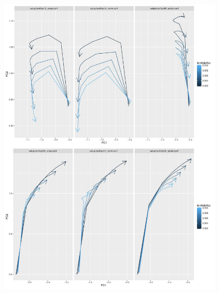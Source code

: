 


\begin{figure}
	\includegraphics[width=\linewidth,height=0.9\textheight]{Figures/Final/A-lutecia-morphotrajs.jpg}

\end{figure}
